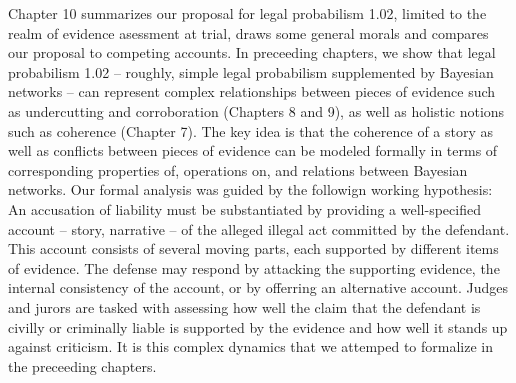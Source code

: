 \documentclass[10pt,dvipsnames,enabledeprecatedfontcommands]{scrartcl}
\begin{document}
Chapter 10 summarizes our proposal for legal probabilism 1.02, limited
to the realm of evidence asessment at trial, draws some general morals
and compares our proposal to competing accounts. In preceeding chapters,
we show that legal probabilism 1.02 -- roughly, simple legal probabilism
supplemented by Bayesian networks -- can represent complex relationships
between pieces of evidence such as undercutting and corroboration
(Chapters 8 and 9), as well as holistic notions such as coherence
(Chapter 7). The key idea is that the coherence of a story as well as
conflicts between pieces of evidence can be modeled formally in terms of
corresponding properties of, operations on, and relations between
Bayesian networks. Our formal analysis was guided by the followign
working hypothesis: An accusation of liability must be substantiated by
providing a well-specified account -- story, narrative -- of the alleged
illegal act committed by the defendant. This account consists of several
moving parts, each supported by different items of evidence. The defense
may respond by attacking the supporting evidence, the internal
consistency of the account, or by offerring an alternative account.
Judges and jurors are tasked with assessing how well the claim that the
defendant is civilly or criminally liable is supported by the evidence
and how well it stands up against criticism. It is this complex dynamics
that we attemped to formalize in the preceeding chapters.
\end{document}

